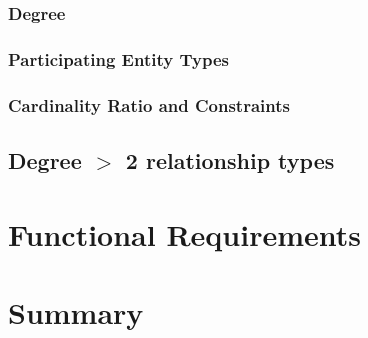 \documentclass{article}
\begin{document}
        \subsubsection{Degree}
        \subsubsection{Participating Entity Types}
        \subsubsection{Cardinality Ratio and Constraints}
        \subsection{Degree $>$ 2 relationship types}

\section{Functional Requirements}

\section{Summary}
\end{document}
